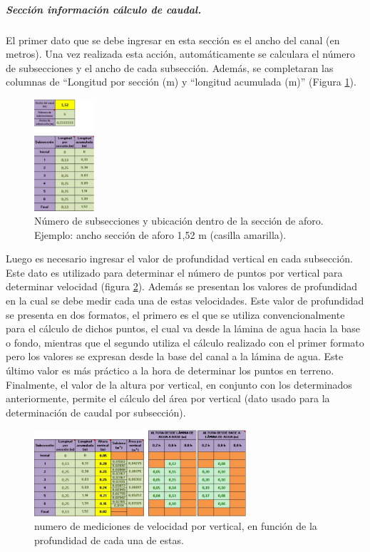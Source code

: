 \documentclass[]{article}
\begin{document}
\subparagraph{Sección información cálculo de caudal.}
El primer dato que se debe ingresar en esta sección es el ancho del canal (en metros). Una vez realizada esta acción, automáticamente se calculara el número de subsecciones y el ancho de cada subsección. Además, se completaran las columnas de “Longitud por sección (m) y “longitud acumulada (m)” (Figura \ref{casilla}).

\begin{figure}[H]
\centering
\includegraphics[width=0.2\textwidth]{images/n_subsecciones.eps}
\caption{Número de subsecciones y ubicación dentro de la sección de aforo. Ejemplo: ancho sección de aforo 1,52 m (casilla amarilla).}
\label{casilla}
\end{figure}

Luego es necesario ingresar el valor de profundidad vertical en cada subsección. Este dato es utilizado para determinar el número de puntos por vertical para determinar velocidad (figura \ref{pto_vert}). Además se presentan los valores de profundidad en la cual se debe medir cada una de estas velocidades. Este valor de profundidad se presenta en dos formatos, el primero es el que se utiliza convencionalmente para el cálculo de dichos puntos, el cual va desde la lámina de agua hacia la base o fondo, mientras que el segundo utiliza el cálculo realizado con el primer formato pero los valores se expresan desde la base del canal a la lámina de agua. Este último valor es más práctico a la hora de determinar los puntos en terreno. Finalmente, el valor de la altura por vertical, en conjunto con los determinados anteriormente, permite el cálculo del área por vertical (dato usado para la determinación de caudal por subsección). 

\begin{figure}[H]
\centering
\includegraphics[width=0.7\textwidth]{images/puntos_vertical.eps}
\caption{numero de mediciones de velocidad por vertical, en función de la profundidad de cada una de estas.}
\label{pto_vert}
\end{figure}
\end{document}
